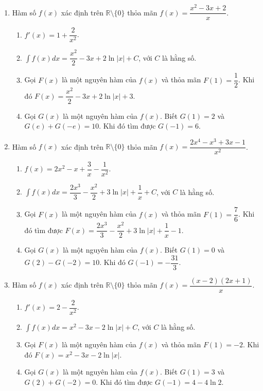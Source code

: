 \documentclass[12pt]{article}
\begin{document}
\begin{enumerate}[label=\textbf{Câu \arabic*.}, start=1]
		\item Hàm số $f(x)$ xác định trên $\mathbb{R} \setminus \{0\}$ thỏa mãn $f(x) = \dfrac{x^2 - 3x + 2}{x}$.
		\begin{enumerate}[label=\alph*)]
			\item $f'(x) = 1 + \dfrac{2}{x^2}$.
			\item $\displaystyle \int f(x) dx = \dfrac{x^2}{2} - 3x + 2\ln|x| + C$, với $C$ là hằng số.
			\item Gọi $F(x)$ là một nguyên hàm của $f(x)$ và thỏa mãn $F(1) = \dfrac{1}{2}$. Khi đó $F(x) = \dfrac{x^2}{2} - 3x + 2\ln|x| + 3$.
			\item Gọi $G(x)$ là một nguyên hàm của $f(x)$. Biết $G(1) = 2$ và $G(e) + G(-e) = 10$. Khi đó tìm được $G(-1) = 6$.
		\end{enumerate}
		
		\item Hàm số $f(x)$ xác định trên $\mathbb{R} \setminus \{0\}$ thỏa mãn $f(x) = \dfrac{2x^4 - x^3 + 3x - 1}{x^2}$.
		\begin{enumerate}[label=\alph*)]
			\item $f(x) = 2x^2 - x + \dfrac{3}{x} - \dfrac{1}{x^2}$.
			\item $\displaystyle \int f(x) dx = \dfrac{2x^3}{3} - \dfrac{x^2}{2} + 3\ln|x| + \dfrac{1}{x} + C$, với $C$ là hằng số.
			\item Gọi $F(x)$ là một nguyên hàm của $f(x)$ và thỏa mãn $F(1) = \dfrac{7}{6}$. Khi đó tìm được $F(x) = \dfrac{2x^3}{3} - \dfrac{x^2}{2} + 3\ln|x| + \dfrac{1}{x} - 1$.
			\item Gọi $G(x)$ là một nguyên hàm của $f(x)$. Biết $G(1) = 0$ và $G(2) - G(-2) = 10$. Khi đó $G(-1) = -\dfrac{31}{3}$.
		\end{enumerate}
		
		\item Hàm số $f(x)$ xác định trên $\mathbb{R} \setminus \{0\}$ thỏa mãn $f(x) = \dfrac{(x-2)(2x+1)}{x}$.
		\begin{enumerate}[label=\alph*)]
			\item $f'(x) = 2 - \dfrac{2}{x^2}$.
			\item $\displaystyle \int f(x) dx = x^2 - 3x - 2\ln|x| + C$, với $C$ là hằng số.
			\item Gọi $F(x)$ là một nguyên hàm của $f(x)$ và thỏa mãn $F(1) = -2$. Khi đó $F(x) = x^2 - 3x - 2\ln|x|$.
			\item Gọi $G(x)$ là một nguyên hàm của $f(x)$. Biết $G(1) = 3$ và $G(2) + G(-2) = 0$. Khi đó tìm được $G(-1) = 4 - 4\ln 2$.
		\end{enumerate}
		

\end{enumerate}
\end{document}
